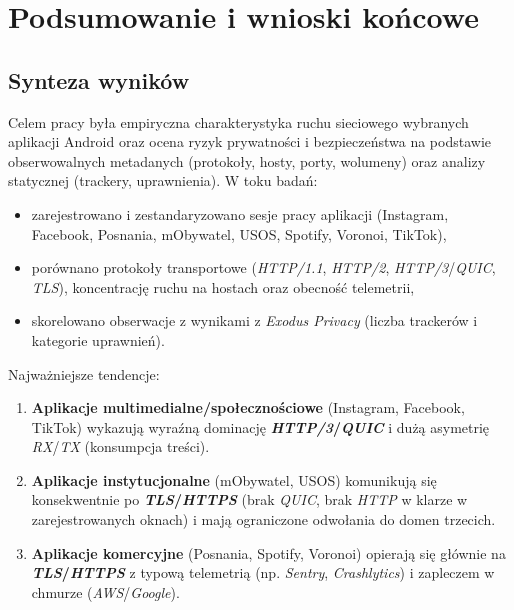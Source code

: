 \chapter{Podsumowanie i wnioski końcowe}

\section{Synteza wyników}

Celem pracy była empiryczna charakterystyka ruchu sieciowego wybranych aplikacji Android oraz ocena ryzyk prywatności i bezpieczeństwa na podstawie obserwowalnych metadanych (protokoły, hosty, porty, wolumeny) oraz analizy statycznej (trackery, uprawnienia). W toku badań:

\begin{itemize}
  \item zarejestrowano i zestandaryzowano sesje pracy aplikacji (Instagram, Facebook, Posnania, mObywatel, USOS, Spotify, Voronoi, TikTok),
  \item porównano protokoły transportowe (\emph{HTTP/1.1}, \emph{HTTP/2}, \emph{HTTP/3}/\emph{QUIC}, \emph{TLS}), koncentrację ruchu na hostach oraz obecność telemetrii,
  \item skorelowano obserwacje z wynikami z \emph{Exodus Privacy} (liczba trackerów i kategorie uprawnień).
\end{itemize}

\noindent Najważniejsze tendencje:
\begin{enumerate}
  \item \textbf{Aplikacje multimedialne/społecznościowe} (Instagram, Facebook, TikTok) wykazują wyraźną dominację \textbf{\emph{HTTP/3}/\emph{QUIC}} i dużą asymetrię \emph{RX}/\emph{TX} (konsumpcja treści).
  \item \textbf{Aplikacje instytucjonalne} (mObywatel, USOS) komunikują się konsekwentnie po \textbf{\emph{TLS}/\emph{HTTPS}} (brak \emph{QUIC}, brak \emph{HTTP} w klarze w zarejestrowanych oknach) i mają ograniczone odwołania do domen trzecich.
  \item \textbf{Aplikacje komercyjne} (Posnania, Spotify, Voronoi) opierają się głównie na \textbf{\emph{TLS}/\emph{HTTPS}} z typową telemetrią (np. \emph{Sentry}, \emph{Crashlytics}) i zapleczem w chmurze (\emph{AWS}/\emph{Google}).
\end{enumerate}

